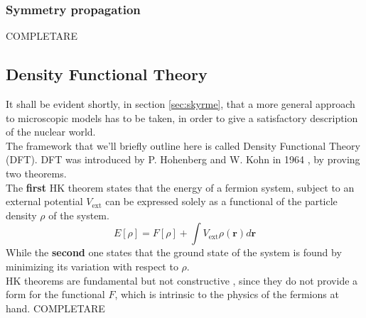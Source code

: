 \subsubsection{Symmetry propagation}
COMPLETARE
\subsection{Density Functional Theory}
It shall be evident shortly, in section \ref{sec:skyrme}, that a more general approach to microscopic models has to be taken, in order to give a satisfactory description of the nuclear world.
\\The framework that we'll briefly outline here is called Density Functional Theory (DFT). DFT was introduced by P. Hohenberg and W. Kohn in 1964 \cite{HK}, by proving two theorems.
\\The \textbf{first} HK theorem states that the energy of a fermion system, subject to an external potential $V_\text{ext}$ can be expressed solely as a functional of the particle density $\rho$ of the system.
\begin{equation}
    \label{eq:hk_theorem1}
    E[\rho] = F[\rho] + \int V_\text{ext} \rho(\bm r) d\mathbf r
\end{equation}
While the \textbf{second} one states that the ground state of the system is found by minimizing its variation with respect to $\rho$. 
\\HK theorems are fundamental but not constructive \cite{NDFT}, since they do not provide a form for the functional $F$, which is intrinsic to the physics of the fermions at hand.
COMPLETARE



